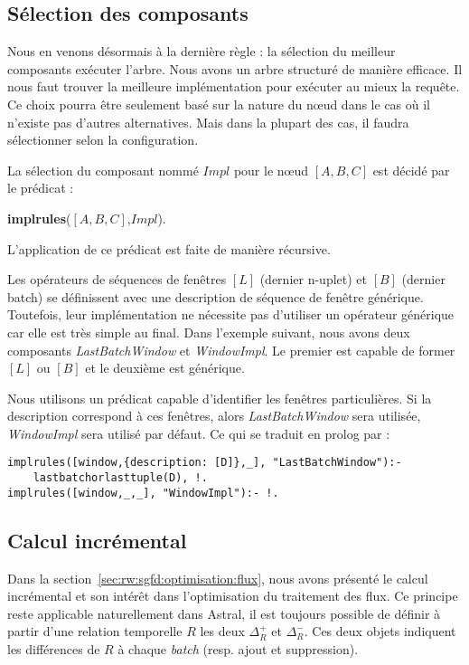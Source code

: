 \subsection{Sélection des composants}
Nous en venons désormais à la dernière règle : la sélection du meilleur composants exécuter l'arbre. Nous avons un arbre structuré de manière efficace. Il nous faut trouver la meilleure implémentation pour exécuter au mieux la requête. Ce choix pourra être seulement basé sur la nature du nœud dans le cas où il n'existe pas d'autres alternatives. Mais dans la plupart des cas, il faudra sélectionner selon la configuration.
\begin{regle}
La sélection du composant nommé $Impl$ pour le nœud $[A,B,C]$ est décidé par le prédicat :
\begin{center} \textbf{implrules}($[A,B,C]$,$Impl$).\end{center}
L'application de ce prédicat est faite de manière récursive.
\end{regle}
\begin{example}
    Les opérateurs de séquences de fenêtres $[L]$ (dernier n-uplet) et $[B]$ (dernier batch) se définissent avec une description de séquence de fenêtre générique. Toutefois, leur implémentation ne nécessite pas d'utiliser un opérateur générique car elle est très simple au final. Dans l'exemple suivant, nous avons deux composants \textit{LastBatchWindow} et \textit{WindowImpl}. Le premier est capable de former $[L]$ ou $[B]$ et le deuxième est générique.

    Nous utilisons un prédicat capable d'identifier les fenêtres particulières. Si la description correspond à ces fenêtres, alors \textit{LastBatchWindow} sera utilisée, \textit{WindowImpl} sera utilisé par défaut. Ce qui se traduit en prolog par :
\begin{lstlisting}
implrules([window,{description: [D]},_], "LastBatchWindow"):-
    lastbatchorlasttuple(D), !.
implrules([window,_,_], "WindowImpl"):- !.
\end{lstlisting}
\end{example}

\subsection{Calcul incrémental}
Dans la section~\ref{sec:rw:sgfd:optimisation:flux}, nous avons présenté le calcul incrémental et son intérêt dans l'optimisation du traitement des flux. Ce principe reste applicable naturellement dans Astral, il est toujours possible de définir à partir d'une relation temporelle $R$ les deux $\Delta_R^+$ et $\Delta_R^-$. Ces deux objets indiquent les différences de $R$ à chaque \textit{batch} (resp. ajout et suppression). 

